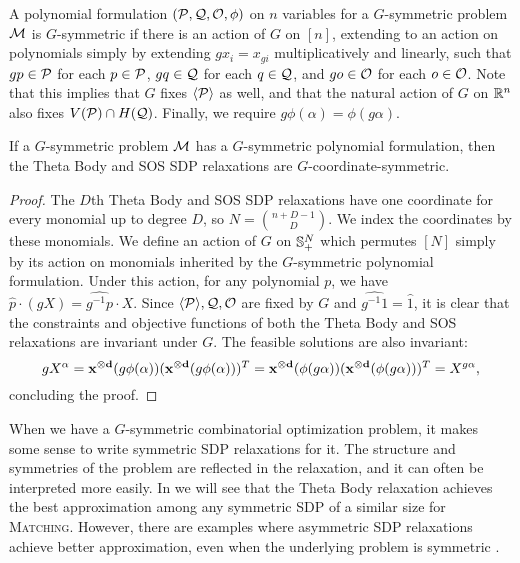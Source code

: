 \begin{definition}
A polynomial formulation $(\mathcal P,\mathcal Q,\mathcal O,\phi)$ on $n$ variables for a $G$-symmetric problem $\mathcal M$ is $G$-symmetric if there is an action of $G$ on $[n]$, extending to an action on polynomials simply by extending $gx_i = x_{gi}$ multiplicatively and linearly, such that $gp \in \mathcal P$ for each $p \in \mathcal P$, $gq \in \mathcal Q$ for each $q \in \mathcal Q$, and $go \in \mathcal O$ for each $o \in \mathcal O$. Note that this implies that $G$ fixes $\langle \mathcal P \rangle$ as well, and that the natural action of $G$ on $\mathbb R^n$ also fixes $V(\mathcal P) \cap H(\mathcal Q)$. Finally, we require $g\phi(\alpha) = \phi(g\alpha)$.
\end{definition}

\begin{lemma}
If a $G$-symmetric problem $\mathcal M$ has a $G$-symmetric polynomial formulation, then the Theta Body and SOS SDP relaxations are $G$-coordinate-symmetric.
\end{lemma}
\begin{proof}
The $D$th Theta Body and SOS SDP relaxations have one coordinate for every monomial up to degree $D$, so $N = \binom{n+D-1}{D}$. We index the coordinates by these monomials. We define an action of $G$ on $\mathbb{S}^{N}_+$ which permutes $[N]$ simply by its action on monomials inherited by the $G$-symmetric polynomial formulation. Under this action, for any polynomial $p$, we have $\hat{p}\cdot (gX) = \widehat{g^{-1}p} \cdot X$. Since $\langle \mathcal P \rangle,\mathcal Q,\mathcal O$ are fixed by $G$ and $\widehat{g^{-1}1} = \hat{1}$, it is clear that the constraints and objective functions of both the Theta Body and SOS relaxations are invariant under $G$. The feasible solutions are also invariant:
\[gX^\alpha = \mathbf{x^{\otimes d}}(g\phi(\alpha))(\mathbf{x^{\otimes d}}(g\phi(\alpha)))^T = \mathbf{x^{\otimes d}}(\phi(g\alpha))(\mathbf{x^{\otimes d}}(\phi(g\alpha)))^T = X^{g\alpha},\]
concluding the proof.
\end{proof}

When we have a $G$-symmetric combinatorial optimization problem, it makes some sense to write symmetric SDP relaxations for it.
The structure and symmetries of the problem are reflected in the relaxation, and it can often be interpreted more easily. 
In  we will see that the Theta Body relaxation achieves the best approximation among any symmetric SDP of a similar size for \textsc{Matching}.
However, there are examples where asymmetric SDP relaxations achieve better approximation, even when the underlying problem is symmetric \cite{KPT10}. 